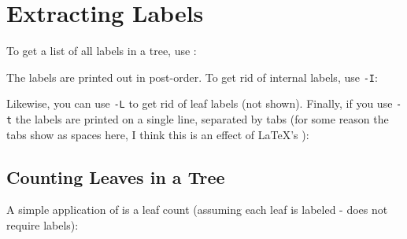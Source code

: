 

\section{Extracting Labels}
\label{sct_labels}

To get a list of all labels in a tree, use :




\noindent{}The labels are printed out in post-order. To get rid of internal labels, use \texttt{-I}:




\noindent{}Likewise, you can use \texttt{-L} to get rid of leaf labels (not shown). Finally, if you use \texttt{-t} the labels are printed on a single line, separated by tabs (for some reason the tabs show as spaces here, I think this is an effect of \LaTeX{}'s \verb++):




\subsection{Counting Leaves in a Tree}
\label{sct_counting_leaves}

A simple application of  is a leaf count (assuming each leaf is
labeled - \nw{} does not require labels):




